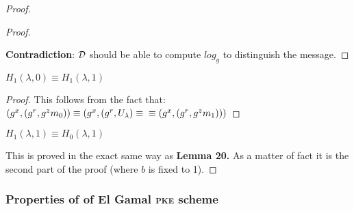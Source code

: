 \begin{proof}
\begin{proof}
\begin{figure}[ht!]
        \end{figure}

        \textbf{Contradiction}: $\mathcal{D}$ should be able to compute $log_g$ to distinguish the message.

    \end{proof}

    \begin{lemma}
        $H_1(\lambda,0)\equiv H_1(\lambda,1)$
    \end{lemma}
    \begin{proof}
        This follows from the fact that:
        $(g^x,(g^r,g^z m_0))\equiv (g^x,(g^r,U_{\lambda}) \equiv \\ \equiv (g^x,(g^r,g^z m_1)))$
    \end{proof}
    
    \begin{lemma}
        $H_1(\lambda,1)\equiv H_0(\lambda,1)$
    \end{lemma}
    This is proved in the exact same way as \textbf{Lemma 20.} As a matter of fact it is the second part of the proof (where $b$ is fixed to 1).
    
\end{proof}

\subsubsection{Properties of of El Gamal \textsc{pke} scheme}

